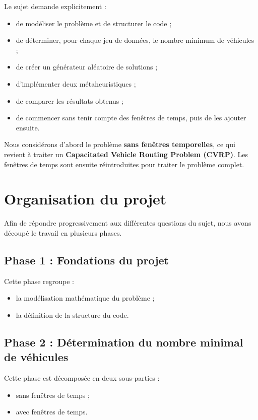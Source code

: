 \documentclass[11pt,a4paper]{article}
\begin{document}
Le sujet demande explicitement :
\begin{itemize}
    \item de modéliser le problème et de structurer le code ;
    \item de déterminer, pour chaque jeu de données, le nombre minimum de véhicules ;
    \item de créer un générateur aléatoire de solutions ;
    \item d'implémenter deux métaheuristiques ;
    \item de comparer les résultats obtenus ;
    \item de commencer sans tenir compte des fenêtres de temps, puis de les ajouter ensuite.
\end{itemize}

Nous considérons d'abord le problème \textbf{sans fenêtres temporelles}, ce qui revient à traiter un \textbf{Capacitated Vehicle Routing Problem (CVRP)}. Les fenêtres de temps sont ensuite réintroduites pour traiter le problème complet.

\section{Organisation du projet}

Afin de répondre progressivement aux différentes questions du sujet, nous avons découpé le travail en plusieurs phases.

\subsection{Phase 1 : Fondations du projet}
Cette phase regroupe :
\begin{itemize}
    \item la modélisation mathématique du problème ;
    \item la définition de la structure du code.
\end{itemize}

\subsection{Phase 2 : Détermination du nombre minimal de véhicules}
Cette phase est décomposée en deux sous-parties :
\begin{itemize}
    \item sans fenêtres de temps ;
    \item avec fenêtres de temps.
\end{itemize}
\end{document}
